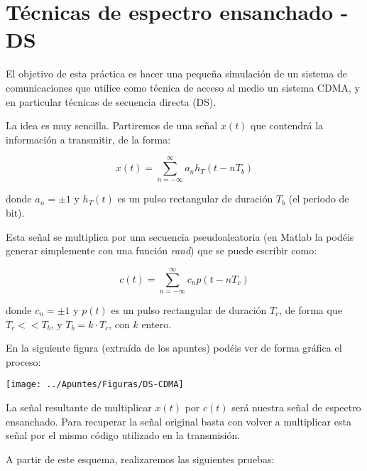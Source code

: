 \documentclass[es,practica]{uah}
\begin{document}

\maketitle

\section{Técnicas de espectro ensanchado - DS}

El objetivo de esta práctica es hacer una pequeña simulación de un sistema de comunicaciones que utilice como técnica de acceso al medio un sistema CDMA, y en particular técnicas de secuencia directa (DS). 

La idea es muy sencilla. Partiremos de una señal $x(t)$ que contendrá la información a transmitir, de la forma:

\begin{equation}
	x(t) = \sum_{n=-\infty}^{\infty} a_n h_T(t - nT_b)
\end{equation}

donde $a_n = \pm 1$ y $h_T(t)$ es un pulso rectangular de duración $T_b$ (el periodo de bit).

Esta señal se multiplica por una secuencia pseudoaleatoria (en Matlab la podéis generar simplemente con una función \emph{rand}) que se puede escribir como:

\begin{equation}
	c(t) = \sum_{n=-\infty}^{\infty} c_n p(t - nT_c)
\end{equation}

donde $c_n=\pm 1$ y $p(t)$ es un pulso rectangular de duración $T_c$, de forma que $T_c << T_b$, y $T_b = k\cdot T_c$, con $k$ entero. 

En la siguiente figura (extraída de los apuntes) podéis ver de forma gráfica el proceso: 

\begin{figure*}[h!]
	\centering\texttt{[image: ../Apuntes/Figuras/DS-CDMA]}
\end{figure*}


La señal resultante de multiplicar $x(t)$ por $c(t)$ será nuestra señal de espectro ensanchado. Para recuperar la señal original basta con volver a multiplicar esta señal por el mismo código utilizado en la transmisión. 

A partir de este esquema, realizaremos las siguientes pruebas:
\end{document}
